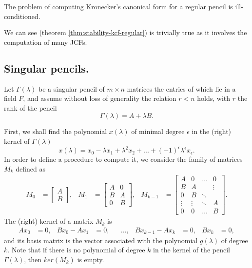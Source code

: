 \begin{theorem} \label{thm:stability-kcf-regular}
    The problem of computing Kronecker's canonical form for a regular pencil
    is ill-conditioned.
\end{theorem} 

We can see  (theorem \ref{thm:stability-kcf-regular}) is
trivially true as it involves the computation of many JCFs.

\subsection*{Singular pencils.}

Let \(\Gamma(\lambda)\) be a singular pencil of \(m \times n\) matrices the entries of which lie in a field \(F\),
and assume without loss of generality the relation \(r < n\) holds, with \(r\) the rank of the pencil
\[\Gamma(\lambda) = A + \lambda B.\]

First, we shall find the polynomial \(x(\lambda)\) of minimal degree \(\epsilon\) in the (right) kernel
of \(\Gamma(\lambda)\)
\[
    x(\lambda) = x_{0} - \lambda x_{1} + \lambda^2 x_{2} + ... + (-1)^\epsilon \lambda^\epsilon x_{\epsilon}.
\]
In order to define a procedure to compute it, we consider the family of matrices
\(M_{k}\) defined as
\begin{align*}
    M_{0} &=
        \begin{bmatrix}
            A \\
            B
        \end{bmatrix},
    & M_{1} &=
        \begin{bmatrix}
            A & 0 \\
            B & A \\
            0 & B
        \end{bmatrix},
    & M_{k-1} &=
        \begin{bmatrix}
            A & 0 & \hdots &    0   \\
            B & A &        & \vdots \\
            0 & B & \ddots & \\
            \vdots & \vdots & \ddots & A \\
            0      &    0   & \hdots & B
        \end{bmatrix}.
\end{align*}
The (right) kernel of a matrix \(M_{k}\) is
\begin{align*}
   Ax_{0} &= 0, &
   Bx_{0} - Ax_{1} &= 0, &
   & ..., &
   Bx_{k-1} - Ax_{k} &= 0, &
   Bx_{k} &= 0,
\end{align*}
and its basis matrix is the vector associated with the polynomial \(g(\lambda)\) of degree \(k\). Note that if
there is no polynomial of degree \(k\) in the kernel of the pencil \(\Gamma(\lambda)\), then \(ker(M_{k})\) is empty.

